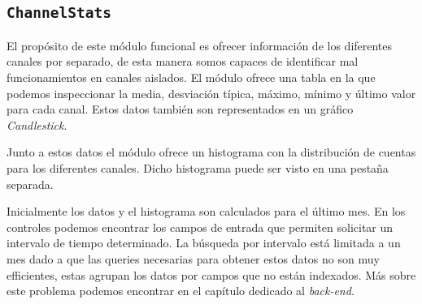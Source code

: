 	\subsection{\texttt{ChannelStats}}
		El propósito de este módulo funcional es ofrecer información de los diferentes canales por separado, de esta manera somos capaces de
		identificar mal funcionamientos en canales aislados. El módulo ofrece una tabla en la que podemos inspeccionar la media, desviación
		típica, máximo, mínimo y último valor para cada canal. Estos datos también son representados en un gráfico \emph{Candlestick}.
		\par
		Junto a estos datos el módulo ofrece un histograma con la distribución de cuentas para los diferentes canales. Dicho histograma puede
		ser visto en una pestaña separada.
		\par
		Inicialmente los datos y el histograma son calculados para el último mes. En los controles podemos encontrar los campos de entrada que
		permiten solicitar un intervalo de tiempo determinado. La búsqueda por intervalo está limitada a un mes dado a que las queries
		necesarias para obtener estos datos no son muy efficientes, estas agrupan los datos por campos que no están indexados. Más sobre este
		problema podemos encontrar en el capítulo dedicado al \emph{back-end}.
